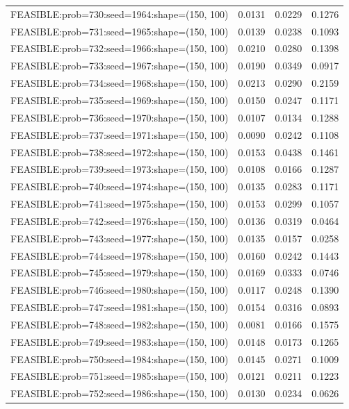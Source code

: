 \begin{longtable}{lccc}
FEASIBLE:prob=730:seed=1964:shape=(150, 100) & 0.0131 & 0.0229 & 0.1276 \\
FEASIBLE:prob=731:seed=1965:shape=(150, 100) & 0.0139 & 0.0238 & 0.1093 \\
FEASIBLE:prob=732:seed=1966:shape=(150, 100) & 0.0210 & 0.0280 & 0.1398 \\
FEASIBLE:prob=733:seed=1967:shape=(150, 100) & 0.0190 & 0.0349 & 0.0917 \\
FEASIBLE:prob=734:seed=1968:shape=(150, 100) & 0.0213 & 0.0290 & 0.2159 \\
FEASIBLE:prob=735:seed=1969:shape=(150, 100) & 0.0150 & 0.0247 & 0.1171 \\
FEASIBLE:prob=736:seed=1970:shape=(150, 100) & 0.0107 & 0.0134 & 0.1288 \\
FEASIBLE:prob=737:seed=1971:shape=(150, 100) & 0.0090 & 0.0242 & 0.1108 \\
FEASIBLE:prob=738:seed=1972:shape=(150, 100) & 0.0153 & 0.0438 & 0.1461 \\
FEASIBLE:prob=739:seed=1973:shape=(150, 100) & 0.0108 & 0.0166 & 0.1287 \\
FEASIBLE:prob=740:seed=1974:shape=(150, 100) & 0.0135 & 0.0283 & 0.1171 \\
FEASIBLE:prob=741:seed=1975:shape=(150, 100) & 0.0153 & 0.0299 & 0.1057 \\
FEASIBLE:prob=742:seed=1976:shape=(150, 100) & 0.0136 & 0.0319 & 0.0464 \\
FEASIBLE:prob=743:seed=1977:shape=(150, 100) & 0.0135 & 0.0157 & 0.0258 \\
FEASIBLE:prob=744:seed=1978:shape=(150, 100) & 0.0160 & 0.0242 & 0.1443 \\
FEASIBLE:prob=745:seed=1979:shape=(150, 100) & 0.0169 & 0.0333 & 0.0746 \\
FEASIBLE:prob=746:seed=1980:shape=(150, 100) & 0.0117 & 0.0248 & 0.1390 \\
FEASIBLE:prob=747:seed=1981:shape=(150, 100) & 0.0154 & 0.0316 & 0.0893 \\
FEASIBLE:prob=748:seed=1982:shape=(150, 100) & 0.0081 & 0.0166 & 0.1575 \\
FEASIBLE:prob=749:seed=1983:shape=(150, 100) & 0.0148 & 0.0173 & 0.1265 \\
FEASIBLE:prob=750:seed=1984:shape=(150, 100) & 0.0145 & 0.0271 & 0.1009 \\
FEASIBLE:prob=751:seed=1985:shape=(150, 100) & 0.0121 & 0.0211 & 0.1223 \\
FEASIBLE:prob=752:seed=1986:shape=(150, 100) & 0.0130 & 0.0234 & 0.0626 \\

\end{longtable}

